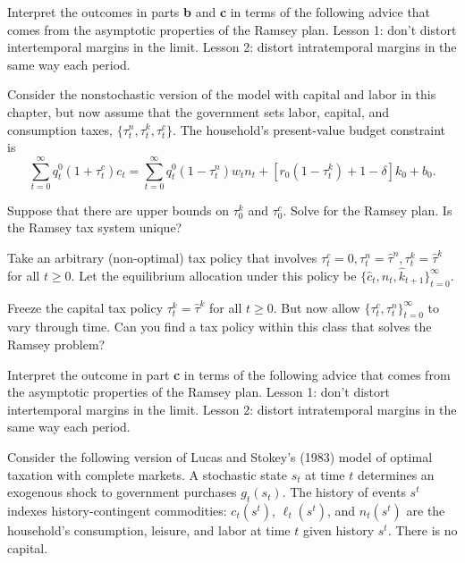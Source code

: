 \medskip
{} Interpret the outcomes in parts {\bf b} and {\bf c} in terms of the following advice that comes from the asymptotic properties
of the Ramsey plan. Lesson 1: don't distort intertemporal margins in the limit.  Lesson 2: distort intratemporal margins in the same way each period.



\medskip

\medskip
{}

\medskip
\noindent
Consider the nonstochastic version of the  model with capital and labor in this
chapter, but now assume that the
government sets labor, capital, and consumption taxes, $\{\tau^n_t, \tau^k_t, \tau^c_t\}$.
The household's present-value budget constraint is
$$
\sum_{t=0}^\infty q^0_t (1+\tau^c_t) c_t =
\sum_{t=0}^\infty q^0_t (1-\tau^n_t) w_t n_t
   + \left[r_{0}(1-\tau^k_t) + 1-\delta \right] k_0 + b_0.
$$

\medskip
{} Suppose that there are upper bounds on $\tau^k_0$ and $\tau^c_0$. Solve for the Ramsey plan.  Is the Ramsey tax system
unique?

\medskip
{} Take an arbitrary (non-optimal) tax policy that involves $\tau^c_t = 0, \tau^n_t = \hat \tau^n, \tau^k_t = \hat \tau^k$
for all $t \geq 0$.  Let the equilibrium allocation under this policy be $\{\hat c_t, \hat n_t, \hat k_{t+1}\}_{t=0}^\infty$.


\medskip
{} Freeze the capital tax policy $\tau^k_t = \hat \tau^k$ for all $t \geq 0$.  But now allow $\{\tau^c_t, \tau^n_t\}_{t=0}^\infty$
to vary through time.  Can you find a tax policy within this class that solves the Ramsey problem?


\medskip
{} Interpret the outcome in part  {\bf c} in terms of the following advice that comes from the asymptotic properties
of the Ramsey plan. Lesson 1: don't distort intertemporal margins in the limit.  Lesson 2: distort intratemporal margins in the same way each period.

\vfil\eject

\medskip
{}

\medskip
\noindent Consider the following version of Lucas and Stokey's (1983) model
of optimal taxation with complete markets.  A stochastic state $s_t$ at time $t$ determines
an exogenous shock to government purchases $g_t(s_t)$. The history of events
$s^t$ indexes history-contingent commodities:
 $c_t(s^t)$, $\ell_t(s^t)$, and $n_t(s^t)$ are the
household's consumption, leisure, and labor at time $t$ given history
$s^t$. There is no capital. %

